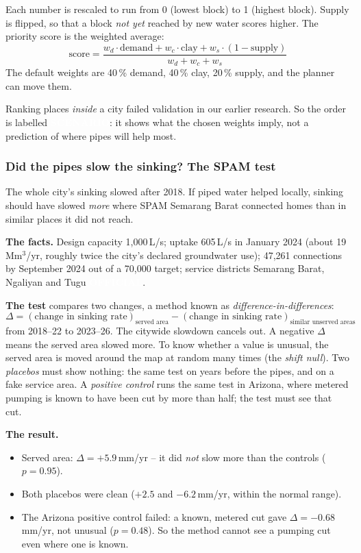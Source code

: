\documentclass[11pt,a4paper]{article}
\newcommand{\pv}[2]{{\setlength{\fboxsep}{1.3pt}\colorbox{#1}{\textcolor{white}{\sffamily\bfseries\fontsize{6.3}{7}\selectfont #2}}}}
\newcommand{\Off}{\pv{accent}{OFFICIAL}}
\newcommand{\Scn}{\pv{scen}{SCENARIO}}
\newcommand{\Mmyr}{\,Mm$^{3}$/yr}
\begin{document}
Each number is rescaled to run from 0 (lowest block) to 1 (highest block). Supply is flipped, so that a
block \emph{not yet} reached by new water scores higher. The priority score is the weighted average:
\[
\text{score} = \frac{w_{d}\cdot\text{demand} + w_{c}\cdot\text{clay} + w_{s}\cdot(1-\text{supply})}{w_{d}+w_{c}+w_{s}}
\]
The default weights are 40\,\% demand, 40\,\% clay, 20\,\% supply, and the planner can move them.

\begin{caution}
Ranking places \emph{inside} a city failed validation in our earlier research. So the order is labelled
\Scn: it shows what the chosen weights imply, not a prediction of where pipes will help most.
\end{caution}

\subsubsection{Did the pipes slow the sinking? The SPAM test}\label{sec:spam}

\begin{plain}
The whole city's sinking slowed after 2018. If piped water helped locally, sinking should have slowed
\emph{more} where SPAM Semarang Barat connected homes than in similar places it did not reach.
\end{plain}

\textbf{The facts.} Design capacity 1,000\,L/s; uptake 605\,L/s in January 2024 (about 19\Mmyr, roughly
twice the city's declared groundwater use); 47,261 connections by September 2024 out of a 70,000 target;
service districts Semarang Barat, Ngaliyan and Tugu \Off.

\textbf{The test} compares two changes, a method known as \emph{difference-in-differences}:
\[
\Delta = (\text{change in sinking rate})_{\text{served area}} - (\text{change in sinking rate})_{\text{similar unserved areas}}
\]
from 2018--22 to 2023--26. The citywide slowdown cancels out. A negative $\Delta$ means the served area
slowed more. To know whether a value is unusual, the served area is moved around the map at random many
times (the \emph{shift null}). Two \emph{placebos} must show nothing: the same test on years before the
pipes, and on a fake service area. A \emph{positive control} runs the same test in Arizona, where metered
pumping is known to have been cut by more than half; the test must see that cut.

\textbf{The result.}
\begin{itemize}
\item Served area: $\Delta = +5.9$\,mm/yr -- it did \emph{not} slow more than the controls ($p = 0.95$).
\item Both placebos were clean ($+2.5$ and $-6.2$\,mm/yr, within the normal range).
\item The Arizona positive control failed: a known, metered cut gave $\Delta = -0.68$\,mm/yr, not unusual
  ($p = 0.48$). So the method cannot see a pumping cut even where one is known.
\end{itemize}
\end{document}
